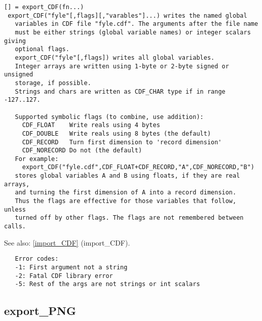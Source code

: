 \documentclass[a4paper]{article}
\begin{document}
\begin{tscreen}
\begin{verbatim}
[] = export_CDF(fn...)
 export_CDF("fyle"[,flags][,"varables"]...) writes the named global
   variables in CDF file "fyle.cdf". The arguments after the file name
   must be either strings (global variable names) or integer scalars giving
   optional flags.
   export_CDF("fyle"[,flags]) writes all global variables.
   Integer arrays are written using 1-byte or 2-byte signed or unsigned
   storage, if possible.
   Strings and chars are written as CDF_CHAR type if in range -127..127.

   Supported symbolic flags (to combine, use addition):
     CDF_FLOAT    Write reals using 4 bytes
     CDF_DOUBLE   Write reals using 8 bytes (the default)
     CDF_RECORD   Turn first dimension to 'record dimension'
     CDF_NORECORD Do not (the default)
   For example:
     export_CDF("fyle.cdf",CDF_FLOAT+CDF_RECORD,"A",CDF_NORECORD,"B")
   stores global variables A and B using floats, if they are real arrays,
   and turning the first dimension of A into a record dimension.
   Thus the flags are effective for those variables that follow, unless
   turned off by other flags. The flags are not remembered between calls.
\end{verbatim}

See also: \ref{import_CDF} {(import\_CDF)}.
\begin{verbatim}
   Error codes:
   -1: First argument not a string
   -2: Fatal CDF library error
   -5: Rest of the args are not strings or int scalars
\end{verbatim}
\end{tscreen}





\subsection{export\_PNG\label{export_PNG}}
\end{document}
